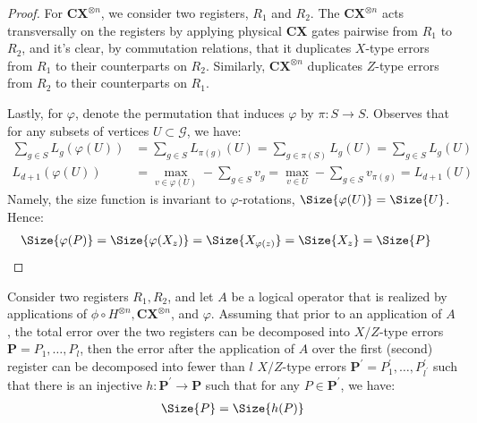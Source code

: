 \begin{proof}

For $\mathbf{CX}^{\otimes n}$, we consider two registers, $R_1$ and $R_2$. The $\mathbf{CX}^{\otimes n}$ acts transversally on the registers by applying physical $\mathbf{CX}$ gates pairwise from $R_1$ to $R_2$, and it's clear, by commutation relations, that it duplicates $X$-type errors from $R_1$ to their counterparts on $R_2$. Similarly, $\mathbf{CX}^{\otimes n}$ duplicates $Z$-type errors from $R_2$ to their counterparts on $R_1$.


Lastly, for $\varphi$, denote the permutation that induces $\varphi$ by $\pi : S \rightarrow S$. Observes that for any subsets of vertices $U\subset \mathcal{G}$, we have:   
\begin{equation*}
  \begin{split}
    \sum_{g \in S}L_{g}(\varphi(U) )  &= \sum_{g \in S}L_{\pi(g)}(U ) = \sum_{g \in \pi(S)}L_{g}(U ) =\sum_{g \in S}L_{g}(U ) \\
    L_{d+1}(\varphi(U) ) &= \max_{v \in \varphi(U) } - \sum_{g \in S} v_{g} = \max_{v \in U } - \sum_{g \in S} v_{\pi(g)} = L_{d+1}(U)
  \end{split}
\end{equation*}
Namely, the size function is invariant to $\varphi$-rotations, $\Size{\varphi(U)} = \Size{U}$. Hence:
\begin{equation*}
  \begin{split}
    \Size{ \varphi (P) } &= \Size{ \varphi (X_{z}) } = \Size{ X_{\varphi(z)} } = \Size{ X_{z} } = \Size{ P }
  \end{split}
\end{equation*}
\end{proof}

\begin{corollary}
Consider two registers $R_{1}, R_{2}$, and let $A$ be a logical operator that is realized by applications of $\phi \circ H^{\otimes n}, \mathbf{CX}^{\otimes n}$, and $\varphi$. Assuming that prior to an application of $A$, the total error over the two registers can be decomposed into $X/Z$-type errors $\mathbf{P} = P_{1}, \ldots, P_{l}$, then the error after the application of $A$ over the first (second) register can be decomposed into fewer than $l$ $X/Z$-type errors $\mathbf{P^{\prime}} = P^{\prime}_{1}, \ldots, P^{\prime}_{l^{\prime}}$ such that there is an injective $h : \mathbf{P^{\prime}} \rightarrow \mathbf{P}$ such that for any $P \in \mathbf{P^{\prime}}$, we have:
  \begin{equation*}
    \begin{split}
      \Size{P} = \Size{ h(P) }
    \end{split}
  \end{equation*}
\end{corollary}
